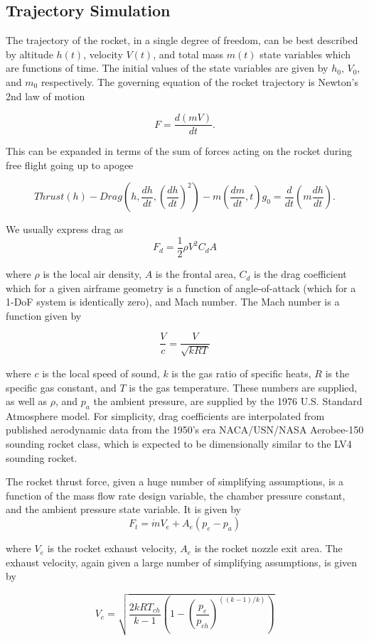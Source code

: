 \documentclass[]{aiaa-tc}%
\begin{document}
\subsection{Trajectory Simulation}
The trajectory of the rocket, in a single degree of freedom, can be best described by altitude $h(t)$, velocity $V(t)$, and total mass $m(t)$ state variables which are functions of time. The initial values of the state variables are given by $h_0$, $V_0$, and $m_0$ respectively. The governing equation of the rocket trajectory is Newton's 2nd law of motion 

$$F = \frac{d(mV)}{dt}.$$

This can be expanded in terms of the sum of forces acting on the rocket during free flight going up to apogee

$$Thrust(h) - Drag\left(h, \frac{dh}{dt}, \left(\frac{dh}{dt} \right)^2 \right) - m\left(\frac{dm}{dt}, t\right)g_0 = \frac{d}{dt} \left(m \frac{dh}{dt}\right).$$

We usually express drag as
\[F_d = \frac{1}{2} \rho V^2 C_d A\]

where $\rho$ is the local air density, $A$ is the frontal area, $C_d$ is the drag coefficient which for a given airframe geometry is a function of angle-of-attack (which for a 1-DoF system is identically zero), and Mach number. The Mach number is a function given by

\[ \frac{V}{c} = \frac{V}{\sqrt{kRT}} \]

where $c$ is the local speed of sound, $k$ is the gas ratio of specific heats, $R$ is the specific gas constant, and $T$ is the gas temperature. These numbers are supplied, as well as $\rho$, and $p_a$ the ambient pressure, are supplied by the 1976 U.S. Standard Atmosphere model. For simplicity, drag coefficients are interpolated from published aerodynamic data from the 1950's era NACA/USN/NASA Aerobee-150 sounding rocket class, which is expected to be dimensionally similar to the LV4 sounding rocket\cite{aerobee}.

The rocket thrust force, given a huge number of simplifying assumptions, is a function of the mass flow rate design variable, the chamber pressure constant, and the ambient pressure state variable. It is given by
\[F_t = \dot{m}V_e + A_e(p_e - p_a) \]

where $V_e$ is the rocket exhaust velocity, $A_e$ is the rocket nozzle exit area. The exhaust velocity, again given a large number of simplifying assumptions, is given by

\[V_e = \sqrt{\frac{2kRT_{ch}}{k - 1}\left(1 - \left(\frac{p_e}{p_{ch}}\right)^{((k - 1)/k)}\right)}\]
\end{document}
